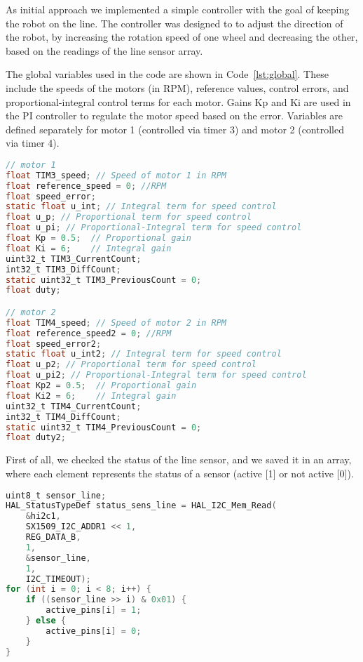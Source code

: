 As initial approach we implemented a simple controller with the goal of keeping the robot on the line.
The controller was designed to to adjust the direction of the robot, by increasing the rotation speed of one wheel and decreasing the other, based on the readings of the line sensor array.

The global variables used in the code are shown in Code~\ref{lst:global}. 
These include the speeds of the motors (in RPM), reference values, control errors, and proportional-integral control terms for each motor. 
Gains Kp and Ki are used in the PI controller to regulate the motor speed based on the error. 
Variables are defined separately for motor 1 (controlled via timer 3) and motor 2 (controlled via timer 4).
\begin{lstlisting}[language=C, caption={Global variables}, label={lst:global}]
// motor 1
float TIM3_speed; // Speed of motor 1 in RPM
float reference_speed = 0; //RPM
float speed_error; 
static float u_int; // Integral term for speed control
float u_p; // Proportional term for speed control
float u_pi; // Proportional-Integral term for speed control
float Kp = 0.5;  // Proportional gain
float Ki = 6;    // Integral gain
uint32_t TIM3_CurrentCount;
int32_t TIM3_DiffCount;
static uint32_t TIM3_PreviousCount = 0;
float duty;

// motor 2
float TIM4_speed; // Speed of motor 2 in RPM
float reference_speed2 = 0; //RPM
float speed_error2;
static float u_int2; // Integral term for speed control
float u_p2; // Proportional term for speed control
float u_pi2; // Proportional-Integral term for speed control
float Kp2 = 0.5;  // Proportional gain
float Ki2 = 6;    // Integral gain
uint32_t TIM4_CurrentCount;
int32_t TIM4_DiffCount;
static uint32_t TIM4_PreviousCount = 0;
float duty2;
\end{lstlisting}

First of all, we checked the status of the line sensor, and we saved it in an array, where each element represents the status of a sensor (active [1] or not active [0]).
\begin{lstlisting}[language=C, caption={Status sensor line}, label={lst:sens_line}]
uint8_t sensor_line;
HAL_StatusTypeDef status_sens_line = HAL_I2C_Mem_Read(
    &hi2c1,
    SX1509_I2C_ADDR1 << 1,
    REG_DATA_B,
    1,
    &sensor_line,
    1,
    I2C_TIMEOUT);
for (int i = 0; i < 8; i++) {
    if ((sensor_line >> i) & 0x01) {
        active_pins[i] = 1;
    } else {
        active_pins[i] = 0;
    }
}
\end{lstlisting}

